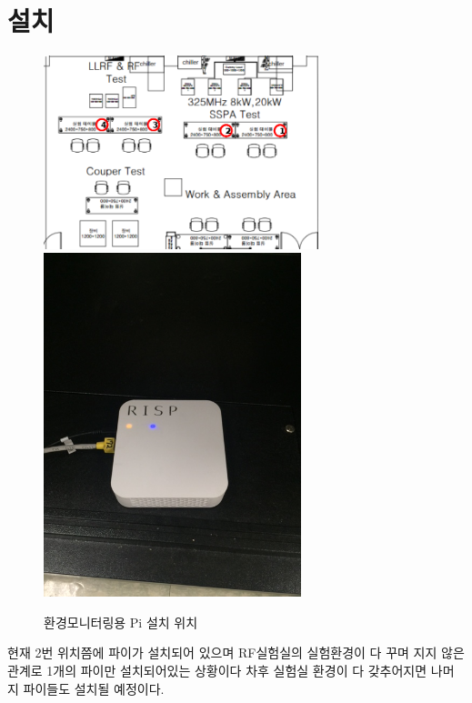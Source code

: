 \documentclass[11pt
  , a4paper
  , article
  , oneside
]{memoir}
\begin{document}
\section{설치}
\begin{center}
	\begin{figure}[h]
		\includegraphics[width=8cm]{./images/RF.png}
		\includegraphics[width=7.5cm]{./images/72.JPG}
		\caption{환경모니터링용 Pi 설치 위치}
	\end{figure}
\end{center}
현재 2번 위치쯤에 파이가 설치되어 있으며 RF실험실의 실험환경이 다 꾸며 지지 않은 관계로 1개의 파이만 설치되어있는 상황이다 차후 실험실 환경이 다 갖추어지면 나머지 파이들도 설치될 예정이다.
\end{document}
